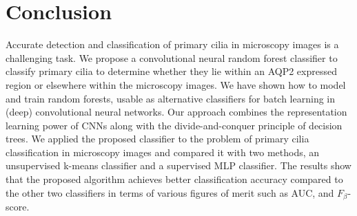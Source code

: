\section{Conclusion}
Accurate detection and classification of primary cilia in microscopy images is a challenging task. We propose a convolutional neural random forest classifier to classify primary cilia to determine whether they lie within an AQP2 expressed region or elsewhere within the microscopy images. We have shown how to model and train random forests, usable as alternative classifiers for batch learning in (deep) convolutional neural networks. Our approach combines the representation learning power of CNNs along with the divide-and-conquer principle of decision trees. We applied the proposed classifier to the problem of primary cilia classification in microscopy images and compared it with two methods, an unsupervised k-means classifier and a supervised MLP classifier. The results show that the proposed algorithm achieves better classification accuracy compared to the other two classifiers in terms of various figures of merit such as AUC, and $F_{\beta}$-score.

%
%
